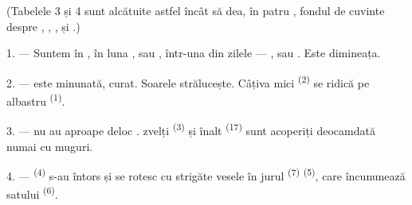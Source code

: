 %
%
%

\VUsaut{3.0mm}
\VUsaut{1.6mm}
\VUsaut{3.4mm}

(Tabelele 3 și 4 sunt alcătuite astfel încât să dea, în patru , fondul de cuvinte despre , ,
,  și .)
\VUsaut{4.0mm}

\VUsaut{3.0mm}

\VUsaut{2.4mm}

\VUsaut{3.0mm}

1. --- Suntem în , în luna , 
sau , într-una din zilele  --- ,
 sau . Este  dimineața.

2. ---  este minunată,  curat. Soarele
strălucește. Câțiva  mici \textsuperscript{(2)} se ridică pe
 albastru \textsuperscript{(1)}.

3. ---  nu au aproape deloc . 
zvelți \textsuperscript{(3)} și  înalt \textsuperscript{(17)}
sunt acoperiți deocamdată numai cu muguri.

4. ---  \textsuperscript{(4)} s-au întors și se rotesc cu
strigăte vesele în jurul  \textsuperscript{(7)}
 \textsuperscript{(5)}, care încununează 
satului \textsuperscript{(6)}.

